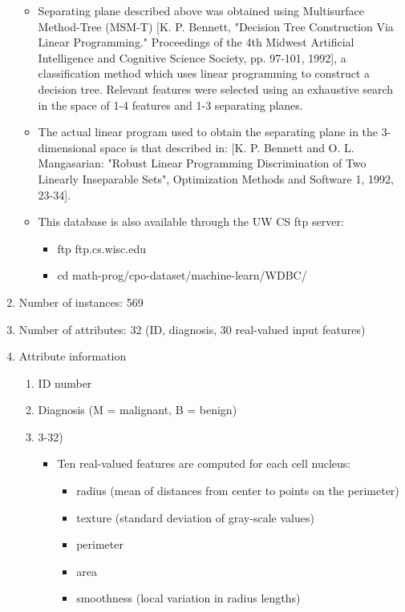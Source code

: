 \documentclass[12pt]{article}
\begin{document}
\begin{enumerate}
\begin{itemize}
        \item Separating plane described above was obtained using Multisurface Method-Tree (MSM-T) [K. P. Bennett, "Decision Tree Construction Via Linear Programming." Proceedings of the 4th Midwest Artificial Intelligence and Cognitive Science Society, pp. 97-101, 1992], a classification method which uses linear programming to construct a decision tree.  Relevant features were selected using an exhaustive search in the space of 1-4 features and 1-3 separating planes.
        \item The actual linear program used to obtain the separating plane in the 3-dimensional space is that described in: [K. P. Bennett and O. L. Mangasarian: "Robust Linear Programming Discrimination of Two Linearly Inseparable Sets", Optimization Methods and Software 1, 1992, 23-34].
        \item This database is also available through the UW CS ftp server:
        \begin{itemize}
            \item ftp ftp.cs.wisc.edu
            \item cd math-prog/cpo-dataset/machine-learn/WDBC/
        \end{itemize}
    \end{itemize}
    \item Number of instances: 569
    \item Number of attributes: 32 (ID, diagnosis, 30 real-valued input features)
    \item Attribute information
    \begin{enumerate}
        \item ID number
        \item Diagnosis (M = malignant, B = benign)
        \item 3-32)
        \begin{itemize}
            \item Ten real-valued features are computed for each cell nucleus:
            \begin{itemize}
                \item radius (mean of distances from center to points on the perimeter)
                \item texture (standard deviation of gray-scale values)
                \item perimeter
                \item area
                \item smoothness (local variation in radius lengths)

\end{itemize}
\end{itemize}
\end{enumerate}
\end{enumerate}
\end{document}
